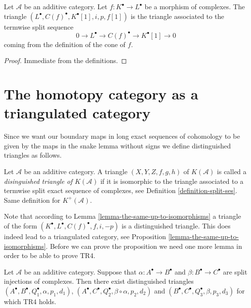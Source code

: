 \begin{lemma}
\label{lemma-rotate-cone}
Let $\mathcal{A}$ be an additive category.
Let $f : K^\bullet \to L^\bullet$ be a morphism of complexes.
The triangle $(L^\bullet, C(f)^\bullet, K^\bullet[1], i, p, f[1])$ is
the triangle associated to the termwise split sequence
$$
0 \to L^\bullet \to C(f)^\bullet \to K^\bullet[1] \to 0
$$
coming from the definition of the cone of $f$.
\end{lemma}

\begin{proof}
Immediate from the definitions.
\end{proof}







\section{The homotopy category as a triangulated category}
\label{section-homotopy-triangulated}

\noindent
Since we want our boundary maps in long exact sequences of cohomology
to be given by the maps in the snake lemma without signs we define
distinguished triangles as follows.

\begin{definition}
\label{definition-distinguished-triangle}
Let $\mathcal{A}$ be an additive category.
A triangle $(X, Y, Z, f, g, h)$ of $K(\mathcal{A})$ is
called a {\it disinguished triangle of $K(\mathcal{A})$}
if it is isomorphic to the triangle associated to
a termwise split exact sequence of complexes, see Definition
\ref{definition-split-ses}.
Same definition for $K^{+}(\mathcal{A})$.
\end{definition}

\noindent
Note that according to Lemma \ref{lemma-the-same-up-to-isomorphisms}
a triangle of the form $(K^\bullet, L^\bullet, C(f)^\bullet, f, i, -p)$
is a distinguished triangle.
This does indeed lead to a triangulated category, see
Proposition \ref{lemma-the-same-up-to-isomorphisms}.
Before we can prove the proposition we need one more lemma
in order to be able to prove TR4.

\begin{lemma}
\label{lemma-two-split-injections}
Let $\mathcal{A}$ be an additive category. Suppose that
$\alpha : A^\bullet \to B^\bullet$ and $\beta : B^\bullet \to C^\bullet$
are split injections of complexes. Then there exist distinguished triangles
$(A^\bullet, B^\bullet, Q_1^\bullet, \alpha, p_1, d_1)$,
$(A^\bullet, C^\bullet, Q_2^\bullet, \beta \circ \alpha, p_2, d_2)$
and
$(B^\bullet, C^\bullet, Q_3^\bullet, \beta, p_3, d_3)$
for which TR4 holds.
\end{lemma}


